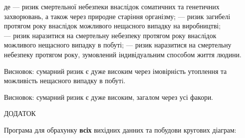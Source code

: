 \documentclass[a4paper,14pt]{extreport}
\begin{document}
де  --- ризик смертельної небезпеки внаслідок соматичних та генетичних
захворювань, а також через природне старіння організму;  --- ризик загибелі протягом року внаслідок можливого нещасного випадку на
виробництві; \\  --- ризик наразитися на смертельну небезпеку протягом року внаслідок можливого нещасного випадку в побуті;  --- ризик наразитися на смертельну небезпеку протягом року, зумовлений індивідуальним способом життя людини.

\vspace{0.5cm}
\begin{minipage}{0.4\textwidth}
Висновок: сумарний ризик є дуже високим через імовірність утоплення та можливість нещасного випадку в побутi.
\end{minipage}
\hfill
\begin{minipage}{0.4\textwidth}
Висновок: сумарний ризик є дуже високим, загалом через усі факори.
\end{minipage}



\newpage
\begin{center}ДОДАТОК\end{center}
Програма для обрахунку \textbf{всіх} вихідних данних та побудови кругових діаграм:\\

\end{document}
